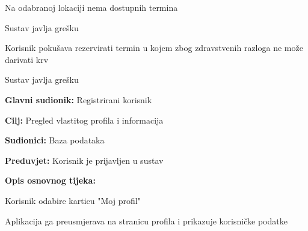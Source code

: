 \begin{packed_item}
\begin{packed_item}
						\item[2.a] Na odabranoj lokaciji nema dostupnih termina
						\item[] \begin{packed_enum}
							\item Sustav javlja grešku
						\end{packed_enum}		
						\item[4.a] Korisnik pokušava rezervirati termin u kojem zbog zdravstvenih razloga ne može darivati krv
						\item[] \begin{packed_enum}
							\item Sustav javlja grešku
						\end{packed_enum}
					\end{packed_item}
				\end{packed_item}
				
				
					\noindent {}
				\begin{packed_item}
					
					\item \textbf{Glavni sudionik: }Registrirani korisnik
					\item  \textbf{Cilj:} Pregled vlastitog profila i informacija
					\item  \textbf{Sudionici:} Baza podataka
					\item  \textbf{Preduvjet:} Korisnik je prijavljen u sustav
					\item  \textbf{Opis osnovnog tijeka:}
					
					\item[] \begin{packed_enum}
						
						\item Korisnik odabire karticu "Moj profil"
						\item Aplikacija ga preusmjerava na stranicu profila i prikazuje korisničke podatke
					\end{packed_enum}
					
				\end{packed_item}
				
				
				
